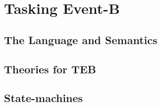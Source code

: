 \section{Tasking Event-B}

\subsection{The Language and Semantics}

\subsection{Theories for TEB}

\subsection{State-machines}